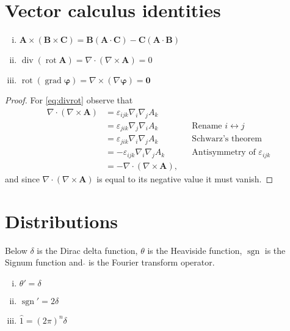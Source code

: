 \documentclass[a4paper, 11pt]{scrartcl}
\begin{document}
\section*{Vector calculus identities}

\begin{enumerate}[(i)]
  \item $\mathbf{A}\times(\mathbf{B}\times\mathbf{C}) = \mathbf{B}(\mathbf{A}\cdot\mathbf{C})-\mathbf{C}(\mathbf{A}\cdot\mathbf{B})$
  \item $\operatorname{div}(\operatorname{rot}\mathbf{A}) =
  \nabla\cdot(\nabla\times\mathbf{A}) = 0\label{eq:divrot}$
  \item $\operatorname{rot}(\operatorname{grad}\mathbf{\varphi}) =
  \nabla\times(\nabla\mathbf{\varphi}) = \mathbf{0}\label{eq:rotgrad}$
\end{enumerate}

\begin{proof}
  For \eqref{eq:divrot} observe that
  \begin{align*}
    \nabla\cdot(\nabla\times\mathbf{A})
    &= \varepsilon_{ijk} \nabla_i \nabla_j A_k \\
    &= \varepsilon_{jik} \nabla_j \nabla_i A_k
    && \text{Rename $i \leftrightarrow j$} \\
    &= \varepsilon_{jik} \nabla_i \nabla_j A_k
    && \text{Schwarz's theorem} \\
    &= -\varepsilon_{ijk} \nabla_i \nabla_j A_k
    && \text{Antisymmetry of $\varepsilon_{ijk}$} \\
    &= -\nabla\cdot(\nabla\times\mathbf{A}),
  \end{align*}
  and since $\nabla\cdot(\nabla\times\mathbf{A})$ is equal to its negative value it must vanish.
\end{proof}

\section*{Distributions}
Below $\delta$ is the Dirac delta function, $\theta$ is the Heaviside function, $\operatorname{sgn}$ is the Signum function and $\hat{}$ is the Fourier transform operator.
\begin{enumerate}[(i)]
  \item $\theta' = \delta$
  \item $\operatorname{sgn}' = 2\delta\label{eq:dsgn}$
  \item $\hat{1} = (2\pi)^n\delta$
\end{enumerate}
\end{document}
